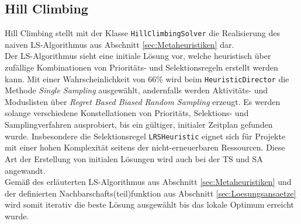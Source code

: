 \subsection{Hill Climbing} \label{subsec:Hill_Climbing}

Hill Climbing stellt mit der Klasse \lstinline|HillClimbingSolver| die Realisierung des naiven \ac{LS}-Algorithmus aus Abschnitt \ref{sec:Metaheuristiken} dar. \\

Der \ac{LS}-Algorithmus sieht eine initiale Lösung vor, welche heuristisch über zufällige Kombinationen von Prioritäts- und Selektionsregeln erstellt werden kann. Mit einer Wahrscheinlichkeit von 66\% wird beim \lstinline|HeuristicDirector| die Methode \textit{Single Sampling} ausgewählt, andernfalls werden Aktivitäts- und Moduslisten über \textit{Regret Based Biased Random Sampling} erzeugt. Es werden solange verschiedene Konstellationen von Prioritäts, Selektions- und Samplingverfahren ausprobiert, bis ein gültiger, initialer Zeitplan gefunden wurde. Insbesondere die Selektionsregel \lstinline|LRSHeuristic| eignet sich für Projekte mit einer hohen Komplexität seitens der nicht-erneuerbaren Ressourcen. Diese Art der Erstellung von initialen Lösungen wird auch bei der \ac{TS} und \ac{SA} angewandt. \\

Gemäß des erläuterten \ac{LS}-Algorithmus aus Abschnitt \ref{sec:Metaheuristiken} und der definierten Nachbarschafts(teil)funktion aus Abschnitt \ref{sec:Loesungsansaetze} wird somit iterativ die beste Lösung ausgewählt bis das lokale Optimum erreicht wurde.